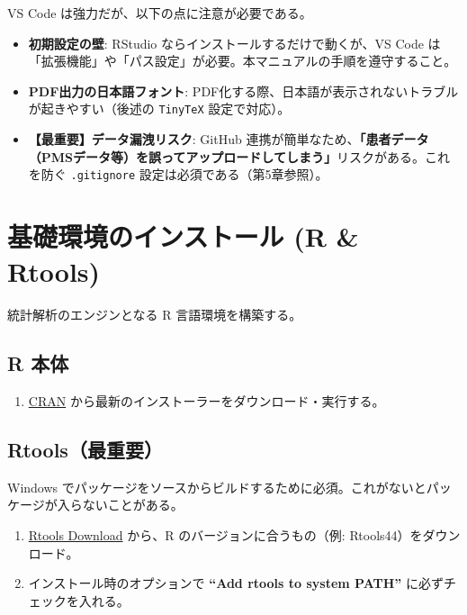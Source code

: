 \documentclass[
  pandoc]{bxjsarticle}
\providecommand{\tightlist}{%
  \setlength{\itemsep}{0pt}\setlength{\parskip}{0pt}}
\begin{document}
VS Code は強力だが、以下の点に注意が必要である。

\begin{itemize}
\tightlist
\item
  \textbf{初期設定の壁}: RStudio ならインストールするだけで動くが、VS
  Code
  は「拡張機能」や「パス設定」が必要。本マニュアルの手順を遵守すること。
\item
  \textbf{PDF出力の日本語フォント}:
  PDF化する際、日本語が表示されないトラブルが起きやすい（後述の
  \texttt{TinyTeX} 設定で対応）。
\item
  \textbf{【最重要】データ漏洩リスク}: GitHub
  連携が簡単なため、\textbf{「患者データ（PMSデータ等）を誤ってアップロードしてしまう」}リスクがある。これを防ぐ
  \texttt{.gitignore} 設定は必須である（第5章参照）。
\end{itemize}

\section{基礎環境のインストール (R \&
Rtools)}\label{ux57faux790eux74b0ux5883ux306eux30a4ux30f3ux30b9ux30c8ux30fcux30eb-r-rtools}

統計解析のエンジンとなる R 言語環境を構築する。

\subsection{R 本体}\label{r-ux672cux4f53}

\begin{enumerate}
\def\labelenumi{\arabic{enumi}.}
\tightlist
\item
  \href{https://cran.r-project.org/bin/windows/base/}{CRAN}
  から最新のインストーラーをダウンロード・実行する。
\end{enumerate}

\subsection{Rtools（最重要）}\label{rtoolsux6700ux91cdux8981}

Windows
でパッケージをソースからビルドするために必須。これがないとパッケージが入らないことがある。

\begin{enumerate}
\def\labelenumi{\arabic{enumi}.}
\tightlist
\item
  \href{https://cran.r-project.org/bin/windows/Rtools/}{Rtools Download}
  から、R のバージョンに合うもの（例: Rtools44）をダウンロード。
\item
  インストール時のオプションで \textbf{``Add rtools to system PATH''}
  に必ずチェックを入れる。
\end{enumerate}
\end{document}
